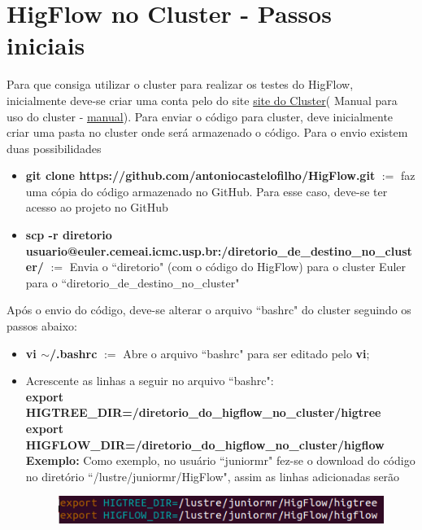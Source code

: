 \documentclass[12pt]{article}
\begin{document}
\section{HigFlow no Cluster - Passos iniciais}\label{sec:clu_pas_ini}

Para que consiga utilizar o cluster para realizar os testes do HigFlow, inicialmente deve-se criar uma conta pelo do site \href{http://www.cemeai.icmc.usp.br/Euler/index.html}{site do Cluster}( Manual para uso do cluster - \href{http://resources.altair.com/pbs/documentation/support/PBSProUserGuide12.2.pdf}{manual}). Para enviar o código para cluster, deve inicialmente criar uma pasta no cluster onde será armazenado o código. Para o envio existem duas possibilidades
\begin{itemize}
	\item \textbf{git clone https://github.com/antoniocastelofilho/HigFlow.git} $:=$ faz uma cópia do código armazenado no GitHub. Para esse caso, deve-se ter acesso ao projeto no GitHub
	\item \textbf{scp -r diretorio usuario@euler.cemeai.icmc.usp.br:/diretorio\_de\_destino\_no\_cluster/}	$:=$ Envia o ``diretorio" (com o código do HigFlow) para o cluster Euler para o ``diretorio\_de\_destino\_no\_cluster"
\end{itemize}
 
 Após o envio do código, deve-se alterar o arquivo ``bashrc" do cluster seguindo os passos abaixo:
 \begin{itemize}
 	\item \textbf{vi $\sim$/.bashrc} $:=$ Abre o arquivo ``bashrc" para ser editado pelo \textbf{vi};
 	\item Acrescente as linhas a seguir no arquivo ``bashrc":\\
 	\textbf{export HIGTREE\_DIR=/diretorio\_do\_higflow\_no\_cluster/higtree}\\
 	\textbf{export HIGFLOW\_DIR=/diretorio\_do\_higflow\_no\_cluster/higflow}\\
 	
 	\textbf{Exemplo:} Como exemplo, no usuário ``juniormr" fez-se o download do código no diretório ``/lustre/juniormr/HigFlow", assim as linhas adicionadas serão\\
 	\begin{figure}[htb]
 		\centering
 		\includegraphics[width=0.98\linewidth]{figures/export_bashrc}
 		\label{fig:fig01}
 	\end{figure}
 \end{itemize}
\end{document}
